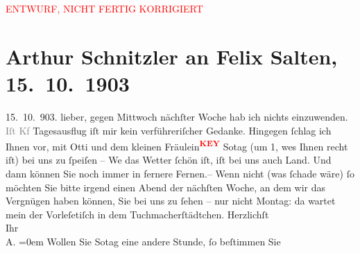 
\begin{center}
            \textcolor{red}{ENTWURF, NICHT FERTIG KORRIGIERT}
                      \end{center}
            
         
         \renewcommand{\erwaehntePersonen}{Personen: Felix Salten, Ottilie Salten}
         \renewcommand{\erwaehnteOrte}{Orte: Brünn, Wien}
         \renewcommand{\erwaehnteWerke}{}
               \section[Arthur Schnitzler an Felix Salten, 15. 10. 1903]{ Arthur Schnitzler an Felix Salten, 15. 10. 1903}\nopagebreak{}\rehead{ }\begin{ledgroupsized}[t]{13cm}\normalsize\beginnumbering \toendnotes[C]{\smallbreak\pagebreak[2]} 
\toendnotes[C]{\smallbreak}\pstart
           \raggedleft{}{\pb}15. 10. 903.\pend
           \pstart
           lieber, gegen Mittwoch nächſter Woche hab ich nichts einzuwenden.
                  \textcolor{gray}{Iſt Kf} Tagesausflug iſt mir kein verführeriſcher Gedanke.
               Hingegen ſchlag ich Ihnen vor, mit Otti und dem kleinen
               Fräulein\textcolor{red}{\textsuperscript{\textbf{KEY}}} So{\geminationn}tag (um 1, we{\geminationn}s {\pb}Ihnen recht iſt) bei uns zu
               ſpeiſen – We{\geminationn} das Wetter ſchön iſt, iſt bei uns auch
               Land. Und dann können Sie noch immer in fernere Fernen.– \pend
           \pstart
           Wenn nicht (was ſchade wäre) ſo möchten Sie bitte irgend einen Abend der {\pb}nächſten Woche, an dem wir das
               Vergnügen haben können, Sie bei uns zu ſehen – nur nicht Montag: da wartet mein der
               Vorleſetiſch in dem Tuchmacherſtädtchen. \pend
           \pstart
           Herzlichſt {\\[\baselineskip]}Ihr {\\[\baselineskip]}\spacefill\mbox{A.}\pend
           \leftskip=0em{}\pstart
           {\pb}Wollen Sie So{\geminationn}tag eine andere Stunde, ſo beſtimmen Sie \pend
           
         
         \endnumbering{}\end{ledgroupsized}\begin{anhang}\end{anhang}\newcommand{\dateiname}{L02985}\newcommand{\titel}{Arthur Schnitzler an Felix Salten, 15. 10. 1903}\newcommand{\editorInnen}{Martin Anton Müller und Laura Untner}
      